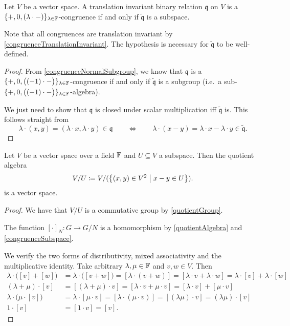 \begin{proposition} \label{congruenceSubspace}
Let $V$ be a vector space.
A translation invariant binary relation $\mathfrak{q}$ on $V$ is a $\{+,0, (\lambda\cdot -)\}_{\lambda\in\mathbb{F}}$-congruence \textup{if and only if} $\widetilde{\mathfrak{q}}$ is a subspace.
\end{proposition}
Note that all congruences are translation invariant by \ref{congruenceTranslationInvariant}. The hypothesis is necessary for $\widetilde{\mathfrak{q}}$ to be well-defined.
\begin{proof}
From \ref{congruenceNormalSubgroup}, we know that $\mathfrak{q}$ is a $\{+,0, \big((-1)\cdot -\big)\}_{\lambda\in\mathbb{F}}$-congruence if and only if $\widetilde{\mathfrak{q}}$ is a subgroup (i.e.\ a sub-$\{+,0, \big((-1)\cdot -\big)\}_{\lambda\in\mathbb{F}}$-algebra).

We just need to show that $\mathfrak{q}$ is closed under scalar multiplication iff $\widetilde{\mathfrak{q}}$ is. This follows straight from
\[ \lambda\cdot(x,y) = (\lambda\cdot x, \lambda\cdot y)\in \mathfrak{q} \qquad\iff\qquad \lambda\cdot(x-y) = \lambda\cdot x - \lambda\cdot y\in \widetilde{\mathfrak{q}}. \]
\end{proof}


\begin{proposition} \label{quotientVectorSpace}
Let $V$ be a vector space over a field $\mathbb{F}$ and $U\subseteq V$ a subspace. Then the quotient algebra
\[ V/U \defeq V/(\setbuilder{(x,y)\in V^2}{x-y\in U}). \]
is a vector space.
\end{proposition}
\begin{proof}
We have that $V/U$ is a commutative group by \ref{quotientGroup}.

The function $[\cdot]_N: G\to G/N$ is a homomorphism by \ref{quotientAlgebra} and \ref{congruenceSubspace}.

We verify the two forms of distributivity, mixed associativity and the multiplicative identity. Take arbitrary $\lambda, \mu\in \mathbb{F}$ and $v,w\in V$. Then
\begin{align*}
\lambda\cdot\big([v]+[w]\big) &= \lambda\cdot\big([v+w]\big) = [\lambda\cdot(v+w)] = [\lambda\cdot v+ \lambda\cdot w] = \lambda\cdot [v] + \lambda\cdot[w] \\
(\lambda + \mu)\cdot[v] &= [(\lambda+\mu)\cdot v] = [\lambda\cdot v + \mu\cdot v] = [\lambda\cdot v] + [\mu\cdot v] \\
\lambda\cdot \big(\mu \cdot [v]\big) &= \lambda\cdot [\mu \cdot v] = [\lambda\cdot (\mu \cdot v)] = [(\lambda\mu)\cdot v] = (\lambda\mu)\cdot [v] \\
1\cdot [v] &= [1\cdot v] = [v].
\end{align*}
\end{proof}


